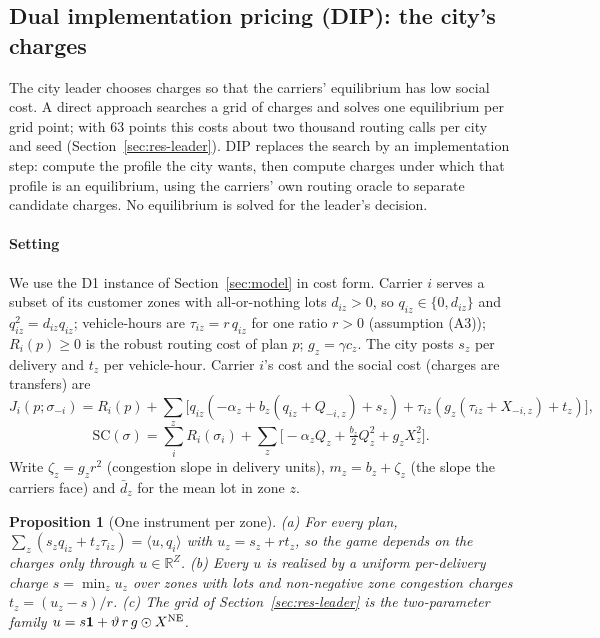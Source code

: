 \documentclass[preprint,12pt]{elsarticle}
\newtheorem{proposition}[theorem]{Proposition}
\theoremstyle{definition}
\theoremstyle{remark}
\newcommand{\R}{\mathbb{R}}
\newcommand{\ip}[2]{\langle #1,#2\rangle}
\begin{document}
\subsection{Dual implementation pricing (DIP): the city's charges}\label{sec:dip}

The city leader chooses charges so that the carriers' equilibrium has low social cost. A direct approach searches a grid of charges and solves one equilibrium per grid point; with 63 points this costs about two thousand routing calls per city and seed (Section~\ref{sec:res-leader}). DIP replaces the search by an implementation step: compute the profile the city wants, then compute charges under which that profile is an equilibrium, using the carriers' own routing oracle to separate candidate charges. No equilibrium is solved for the leader's decision.

\paragraph{Setting} We use the D1 instance of Section~\ref{sec:model} in cost form. Carrier $i$ serves a subset of its customer zones with all-or-nothing lots $d_{iz}>0$, so $q_{iz}\in\{0,d_{iz}\}$ and $q_{iz}^2=d_{iz}q_{iz}$; vehicle-hours are $\tau_{iz}=r\,q_{iz}$ for one ratio $r>0$ (assumption (A3)); $R_i(p)\ge0$ is the robust routing cost of plan $p$; $g_z=\gamma c_z$. The city posts $s_z$ per delivery and $t_z$ per vehicle-hour. Carrier $i$'s cost and the social cost (charges are transfers) are
\[
J_i(p;\sigma_{-i})=R_i(p)+\sum_z\big[q_{iz}(-\alpha_z+b_z(q_{iz}+Q_{-i,z})+s_z)+\tau_{iz}(g_z(\tau_{iz}+X_{-i,z})+t_z)\big],
\]
\[
\mathrm{SC}(\sigma)=\sum_iR_i(\sigma_i)+\sum_z\big[-\alpha_zQ_z+\tfrac{b_z}{2}Q_z^2+g_zX_z^2\big].
\]
Write $\zeta_z=g_zr^2$ (congestion slope in delivery units), $m_z=b_z+\zeta_z$ (the slope the carriers face) and $\bar d_z$ for the mean lot in zone $z$.

\begin{proposition}[One instrument per zone]\label{prop:instr}
(a) For every plan, $\sum_z(s_zq_{iz}+t_z\tau_{iz})=\ip{u}{q_i}$ with $u_z=s_z+rt_z$, so the game depends on the charges only through $u\in\R^Z$. (b) Every $u$ is realised by a uniform per-delivery charge $s=\min_zu_z$ over zones with lots and non-negative zone congestion charges $t_z=(u_z-s)/r$. (c) The grid of Section~\ref{sec:res-leader} is the two-parameter family $u=s\mathbf 1+\vartheta\,r\,g\odot X^{\rm NE}$.
\end{proposition}
\end{document}
